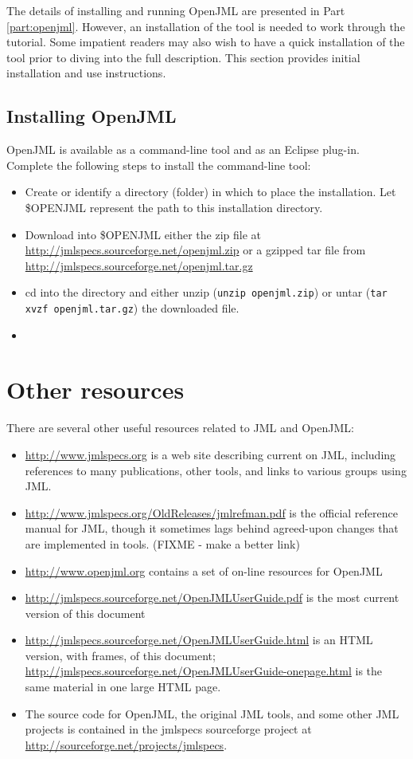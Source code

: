 The details of installing and running OpenJML are presented in Part \ref{part:openjml}. However, an installation of the tool is needed to work through the tutorial. Some impatient readers may also wish to have a quick installation of the tool prior to diving into the full description. This section provides initial installation and use instructions.

\section{Installing OpenJML}

OpenJML is available as a command-line tool and as an Eclipse plug-in. Complete the following steps to install the command-line tool:
\begin{itemize}
\item Create or identify a directory (folder) in which to place the installation. Let \$OPENJML represent the path to this installation directory.
\item Download into \$OPENJML either the zip file at \url{http://jmlspecs.sourceforge.net/openjml.zip} or a gzipped tar file from \url{http://jmlspecs.sourceforge.net/openjml.tar.gz}
\item cd into the directory and either unzip (\texttt{unzip openjml.zip}) or untar (\texttt{tar xvzf openjml.tar.gz}) the downloaded file.
\item
\end{itemize}

\chapter{Other resources}

There are several other useful resources related to JML and OpenJML:
\begin{itemize}
\item \url{http://www.jmlspecs.org} is a web site describing current on JML, including references to many publications, other tools, and links to various groups using JML.
\item \url{http://www.jmlspecs.org/OldReleases/jmlrefman.pdf} is the official reference manual for JML, though it sometimes lags behind agreed-upon changes that are implemented in tools. (FIXME - make a better link)
\item \url{http://www.openjml.org} contains a set of on-line resources for OpenJML
\item \url{http://jmlspecs.sourceforge.net/OpenJMLUserGuide.pdf} is the most current version of this document
\item \url{http://jmlspecs.sourceforge.net/OpenJMLUserGuide.html} is an HTML version, with frames, of this document; \url{http://jmlspecs.sourceforge.net/OpenJMLUserGuide-onepage.html} is the same material in one large HTML page.
\item The source code for OpenJML, the original JML tools, and some other JML projects is contained in the jmlspecs sourceforge project at \url{http://sourceforge.net/projects/jmlspecs}.
\end{itemize}


